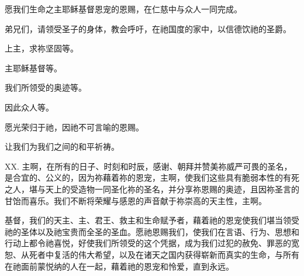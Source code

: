 \par

愿我们生命之主耶稣基督恩宠的恩赐，在仁慈中与众人一同完成。\par

\par

弟兄们，请领受圣子的身体，教会呼吁，在祂国度的家中，以信德饮祂的圣爵。\par

\par

上主，求祢坚固等。\par

\par

主耶稣基督等。\par

\par

我们所领受的奥迹等。\par

\par

因此众人等。\par

\par

愿光荣归于祂，因祂不可言喻的恩赐。\par

\par

让我们为我们之间的和平祈祷。\par

\par

XX. 主啊，在所有的日子、时刻和时辰，感谢、朝拜并赞美祢威严可畏的圣名，是合宜的、公义的，因为祢藉着祢的恩宠，主啊，使我们这些具有脆弱本性的有死之人，堪与天上的受造物一同圣化祢的圣名，并分享祢恩赐的奥迹，且因祢圣言的甘饴而喜乐。我们不断将荣耀与感恩的声音献于祢崇高的天主性，主啊。\par

\par

基督，我们的天主、主、君王、救主和生命赋予者，藉着祂的恩宠使我们堪当领受祂的圣体以及祂宝贵而全圣的圣血。愿祂恩赐我们，使我们在言语、行为、思想和行动上都令祂喜悦，好使我们所领受的这个凭据，成为我们过犯的赦免、罪恶的宽恕、从死者中复活的伟大希望，以及在诸天之国内获得崭新而真实的生命，与所有在祂面前蒙悦纳的人在一起，藉着祂的恩宠和怜爱，直到永远。\par

